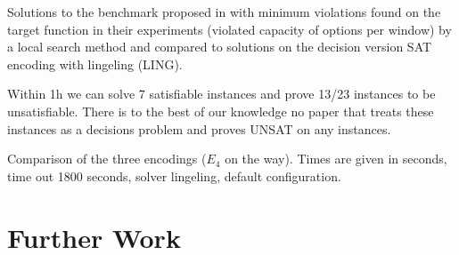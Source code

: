 \documentclass[]{llncs}
\begin{document}
\begin{table}[htbp]
    \caption{Solutions to the benchmark proposed in \cite{Gravel05} with
        minimum violations found on the target function in their
        experiments (violated capacity of options per window) by a local
        search method and compared to solutions on the decision version
    SAT encoding with lingeling (LING). }
    \centering
    \label{tab:2}
\end{table}


Within 1h we can solve 7 satisfiable instances and prove 13/23 instances
to be unsatisfiable. There is to the best of our knowledge no paper that
treats these instances as a decisions problem and proves UNSAT on any
instances.

\begin{table}[htbp]
    \caption{Comparison of the three encodings ($E_4$ on the way). Times
    are given in seconds, time out 1800 seconds, solver lingeling, default configuration.}
    \centering
    
    \label{tab:3}
\end{table}

\section{Further Work}
\end{document}
